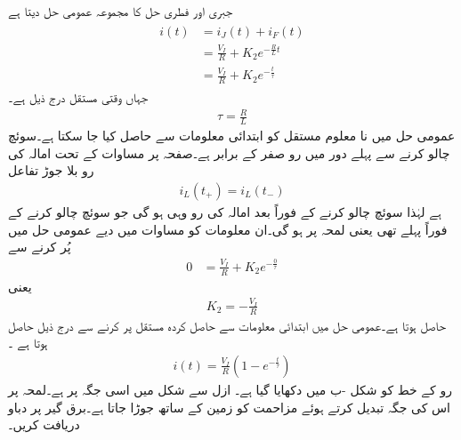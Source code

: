 جبری اور فطری حل کا مجموعہ عمومی حل دیتا ہے
\begin{gather}
\begin{aligned}\label{مساوات_عارضی_مزاحمت_امالہ_مکمل_حل_الف}
i(t)&=i_J(t)+i_F(t)\\
&=\frac{V_I}{R}+K_2e^{-\frac{R}{L}t}\\
&=\frac{V_I}{R}+K_2e^{-\frac{t}{\tau}}
\end{aligned}
\end{gather}
جہاں وقتی مستقل درج ذیل ہے۔
\begin{align}
\tau=\frac{R}{L}
\end{align}
عمومی حل میں نا معلوم مستقل  کو ابتدائی معلومات سے حاصل کیا جا سکتا ہے۔سوئچ چالو کرنے سے پہلے دور میں رو صفر کے برابر ہے۔صفحہ  پر مساوات  کے تحت امالہ کی رو بلا جوڑ تفاعل
\begin{align*}
i_L(t_+)=i_L(t_-)
\end{align*} 
ہے لہٰذا سوئچ چالو کرنے کے فوراً بعد امالہ کی رو وہی ہو گی جو سوئچ چالو کرنے کے فوراً پہلے تھی یعنی لمحہ  پر  ہو گی۔ان معلومات کو مساوات  میں دیے عمومی حل میں پُر کرنے سے
\begin{align*}
0&=\frac{V_I}{R}+K_2e^{-\frac{0}{\tau}}
\end{align*}
یعنی
\begin{align*}
K_2=-\frac{V_I}{R}
\end{align*}
حاصل ہوتا ہے۔عمومی حل میں ابتدائی معلومات سے حاصل کردہ مستقل پر کرنے سے درج ذیل  حاصل ہوتا ہے ۔
\begin{align}
i(t)=\frac{V_I}{R} \left(1-e^{-\frac{t}{\tau}}\right)
\end{align}
رو کے خط کو شکل -ب میں دکھایا گیا ہے۔
ازل سے شکل  میں  اسی جگہ پر ہے۔لمحہ  پر اس کی جگہ تبدیل کرتے ہوئے  مزاحمت کو زمین کے ساتھ جوڑا جاتا ہے۔برق گیر پر دباو دریافت کریں۔
